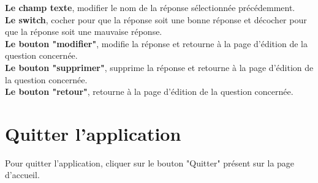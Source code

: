 \documentclass[a4paper]{report}
\begin{document}
\textbf{Le champ texte}, modifier le nom de la réponse sélectionnée précédemment. \\
\textbf{Le switch}, cocher pour que la réponse soit une bonne réponse et décocher pour que la réponse soit une mauvaise réponse. \\
\textbf{Le bouton "modifier"}, modifie la réponse et retourne à la page d'édition de la question concernée. \\
\textbf{Le bouton "supprimer"}, supprime la réponse et retourne à la page d'édition de la question concernée. \\
\textbf{Le bouton "retour"}, retourne à la page d'édition de la question concernée. \\

\chapter{Quitter l'application}
Pour quitter l'application, cliquer sur le bouton "Quitter" présent sur la page d'accueil.

\renewcommand{\listfigurename}{Tables des illustrations}
\listoffigures
\end{document}
